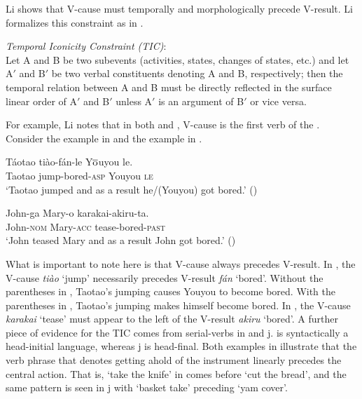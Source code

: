\documentclass[output=paper]{LSP/langsci}
\begin{document}
Li shows that V-cause must temporally and morphologically precede V-result. Li formalizes this constraint as in .

\begin{exe}

\ex\label{ex:rosen:32}
 \emph{Temporal Iconicity Constraint (TIC)}:\\
 Let A and B be two subevents (activities, states, changes of states, etc.) and let A$'$ and B$'$ be two verbal constituents denoting A and B, respectively; then the temporal relation between A and B must be directly reflected in the surface linear order of A$'$ and B$'$ unless A$'$ is an argument of B$'$ or vice versa.
 
 \end{exe}

For example, Li notes that in both  and , V-cause is the first verb of the . Consider the  example in  and the  example in .

 \begin{exe}
 \ex \label{ex:rosen:33}
 \gll Táotao tiào-fán-le {\op}Y$\overline{\rm{o}}$uyou le{\cp}.\\
 Taotao jump-bored-\textsc{asp} {\db}Youyou \textsc{le}\\
 \glt `Taotao jumped and as a result he/(Youyou) got bored.' (\citealt[480 (1b)]{Li1993})
 
 \ex \label{ex:rosen:34}
\gll John-ga Mary-o karakai-akiru-ta.\\
 John-\textsc{nom} Mary-\textsc{acc} tease-bored-\textsc{past}\\
 \glt `John teased Mary and as a result John got bored.'  (\citealt[481 (2b)]{Li1993})
 
 \end{exe}

What is important to note here is that V-cause always precedes V-result. In , the V-cause \textit{tiào} `jump' necessarily precedes V-result \textit{f\'an} `bored'. Without the parentheses in , Taotao's jumping causes Youyou to become bored. With the parentheses in , Taotao's jumping makes himself become bored. In , the V-cause \textit{karakai} `tease' must appear to the left of the V-result \textit{akiru} `bored'. A further piece of evidence for the TIC comes from serial-verbs in  and j.  is syntactically a head-initial language, whereas j is head-final. Both examples in  illustrate that the verb phrase that denotes getting ahold of the instrument linearly precedes the central action. That is, `take the knife' in  comes before `cut the bread', and the same pattern is seen in j with `basket take' preceding `yam cover'.
\end{document}
